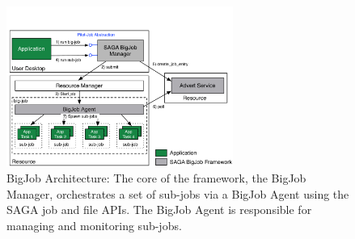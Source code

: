 \documentclass{rspublic}
\newcommand{\up}{\vspace*{-0.3em}}
\newcommand{\jhanote}[1]{ {\textcolor{red} { ***Jha: #1 }}}
\newcommand{\jhanote}[1]{}
\begin{document}
\begin{figure}[ht]
    \centering
    \includegraphics[width=0.66\textwidth]{./bigjob.pdf}
   \caption{BigJob Architecture: The core of the framework, the
      BigJob Manager, orchestrates a set of sub-jobs via a
      BigJob Agent using the SAGA job and file APIs.  The
      BigJob Agent is responsible for managing and monitoring sub-jobs.\up}
   \label{fig:bigjob}
\end{figure}

\end{document}
